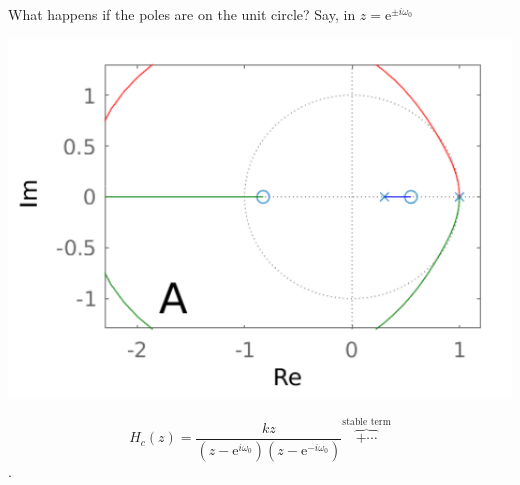 \documentclass[presentation,aspectratio=169]{beamer}
\begin{document}
\begin{frame}[label={sec:org0713314}]{What happens if the poles are \alert{on the} unit circle?}
Say, in \(z = \mathrm{e}^{\pm i \omega_0}\)
\begin{center}
\includegraphics[width=0.3\linewidth]{../../figures/rlocusA.png}
\end{center}

\[H_c(z) = \frac{k z}{(z-\mathrm{e}^{i \omega_0})(z-\mathrm{e}^{-i \omega_0})} \overbrace{+ \cdots}^{\text{stable term}}\].
\end{frame}
\end{document}
